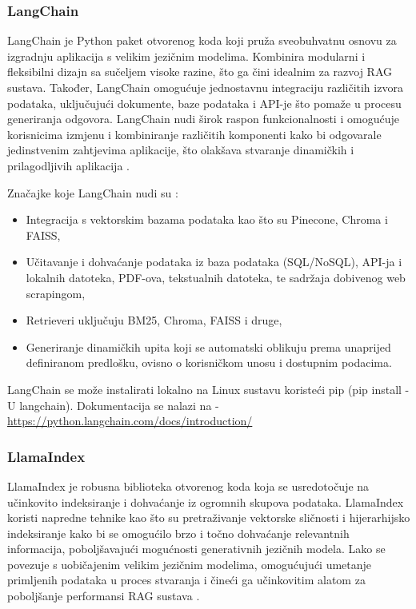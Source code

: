 \documentclass[]{foi}
\begin{document}
\subsubsection{LangChain}
LangChain je Python paket otvorenog koda koji pruža sveobuhvatnu osnovu za izgradnju aplikacija s velikim jezičnim modelima. Kombinira modularni i fleksibilni dizajn sa sučeljem
visoke razine, što ga čini idealnim za razvoj RAG sustava. Također, LangChain omogućuje jednostavnu integraciju različitih izvora podataka, uključujući dokumente, baze podataka i API-je što pomaže u procesu
generiranja odgovora. LangChain nudi širok raspon funkcionalnosti i omogućuje korisnicima izmjenu i kombiniranje različitih komponenti kako bi odgovarale jedinstvenim zahtjevima aplikacije,
što olakšava stvaranje dinamičkih i prilagodljivih aplikacija \cite{novogroder2025ragtools}.

Značajke koje LangChain nudi su \cite{novogroder2025ragtools}:
\begin{itemize}
    \item Integracija s vektorskim bazama podataka kao što su Pinecone, Chroma i FAISS,
    \item Učitavanje i dohvaćanje podataka iz baza podataka (SQL/NoSQL), API-ja i lokalnih datoteka, PDF-ova, tekstualnih datoteka, te sadržaja dobivenog web scrapingom,
    \item Retrieveri uključuju BM25, Chroma, FAISS i druge,
    \item Generiranje dinamičkih upita koji se automatski oblikuju prema unaprijed definiranom predlošku, ovisno o korisničkom unosu i dostupnim podacima.
\end{itemize}

LangChain se može instalirati lokalno na Linux sustavu koristeći pip (pip install -U langchain). Dokumentacija se nalazi na - \url{https://python.langchain.com/docs/introduction/} 


\subsubsection{LlamaIndex}
LlamaIndex je robusna biblioteka otvorenog koda koja se usredotočuje na učinkovito indeksiranje i dohvaćanje iz ogromnih skupova podataka. 
LlamaIndex koristi napredne tehnike kao što su pretraživanje vektorske sličnosti i hijerarhijsko indeksiranje kako bi se omogućilo brzo i 
točno dohvaćanje relevantnih informacija, poboljšavajući mogućnosti generativnih jezičnih modela. Lako se povezuje s uobičajenim 
velikim jezičnim modelima, omogućujući umetanje primljenih podataka u proces stvaranja i čineći ga učinkovitim alatom za poboljšanje performansi 
RAG sustava \cite{novogroder2025ragtools}.
\end{document}
